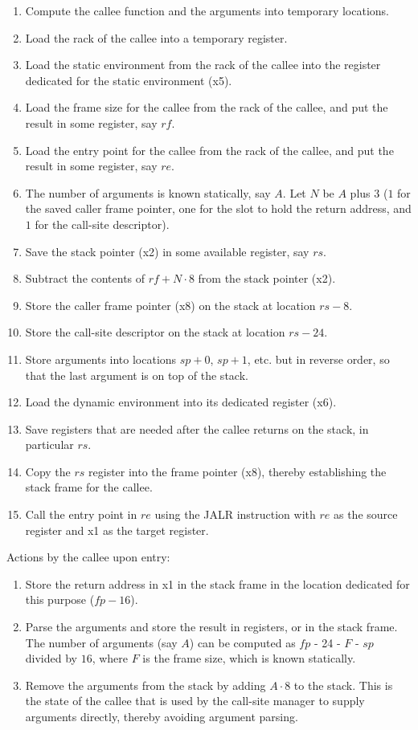 \begin{enumerate}
\item Compute the callee function and the arguments into temporary
  locations.
\item Load the rack of the callee into a temporary register.
\item Load the static environment from the rack of the callee into the
  register dedicated for the static environment (x5).
\item Load the frame size for the callee from the rack of the
  callee, and put the result in some register, say $rf$.
\item Load the entry point for the callee from the rack of the callee,
  and put the result in some register, say $re$.
\item The number of arguments is known statically, say $A$.  Let $N$
  be $A$ plus $3$ ($1$ for the saved caller frame pointer, one for the
  slot to hold the return address, and $1$ for the call-site
  descriptor).
\item Save the stack pointer (x2) in some available register, say $rs$.
\item Subtract the contents of $rf + N \cdot 8$ from the stack
  pointer (x2).
\item Store the caller frame pointer (x8) on the stack at location $rs
  - 8$.
\item Store the call-site descriptor on the stack at location $rs -
  24$.
\item Store arguments into locations $sp +  0$, $sp +  1$, etc. but in
  reverse order, so that the last argument is on top of the stack.
\item Load the dynamic environment into its dedicated register (x6).
\item Save registers that are needed after the callee returns on the
  stack, in particular $rs$.
\item Copy the $rs$ register into the frame pointer (x8), thereby
  establishing the stack frame for the callee.
\item Call the entry point in $re$ using the JALR instruction with
  $re$ as the source register and x1 as the target register.
\end{enumerate}

Actions by the callee upon entry:

\begin{enumerate}
\item Store the return address in x1 in the stack frame in the
  location dedicated for this purpose ($fp - 16$).
\item Parse the arguments and store the result in registers, or in the
  stack frame. The number of arguments (say $A$) can be
  computed as $fp$ - 24 - $F$ - $sp$ divided by $16$, where $F$ is the
  frame size, which is known statically.
\item Remove the arguments from the stack by adding $A \cdot 8$ to the
  stack.  This is the state of the callee that is used by the
  call-site manager to supply arguments directly, thereby avoiding
  argument parsing. 
\end{enumerate}

